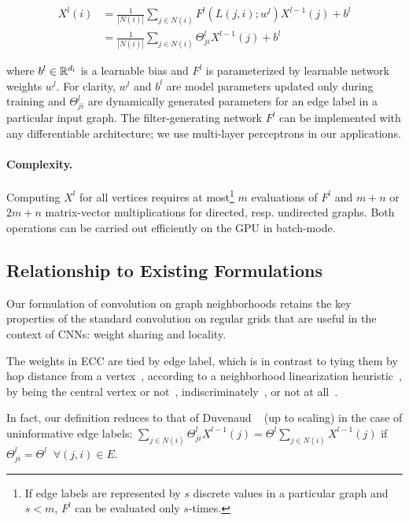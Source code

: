 \documentclass[10pt,twocolumn,letterpaper]{article}
\begin{document}
\begin{equation}
\begin{split}
X^l(i) &= \frac{1}{|N(i)|} \sum_{j\in N(i)} F^l(L(j,i);w^l) X^{l-1}(j) + b^l \label{eq:C1} \\
&= \frac{1}{|N(i)|} \sum_{j\in N(i)} \Theta_{ji}^l X^{l-1}(j) + b^l
\end{split}
\end{equation}

where $b^l\in{\mathbb{R}^{d_l}}$ is a learnable bias and $F^l$ is parameterized by learnable network weights $w^l$. For clarity, $w^l$ and $b^l$ are model parameters updated only during training and $\Theta_{ji}^l$ are dynamically generated parameters for an edge label in a particular input graph. The filter-generating network $F^l$ can be implemented with any differentiable architecture; we use multi-layer perceptrons in our applications.

\paragraph*{Complexity.} Computing $X^l$ for all vertices requires at most\footnote{If edge labels are represented by $s$ discrete values in a particular graph and $s<m$, $F^l$ can be evaluated only $s$-times.} $m$ evaluations of $F^l$ and $m+n$ or $2m+n$ matrix-vector multiplications for directed, resp. undirected graphs. Both operations can be carried out efficiently on the GPU in batch-mode.



\subsection{Relationship to Existing Formulations} \label{subsec:relgridconv}


Our formulation of convolution on graph neighborhoods retains the key properties of the standard convolution on regular grids that are useful in the context of CNNs: weight sharing and locality. 

The weights in ECC are tied by edge label, which is in contrast to tying them by hop distance from a vertex~\cite{dcnn}, according to a neighborhood linearization heuristic~\cite{niepert}, by being the central vertex or not~\cite{kipf}, indiscriminately~\cite{duvenaud}, or not at all~\cite{bruna13}.

In fact, our definition reduces to that of Duvenaud \etal~\cite{duvenaud} (up to scaling) in the case of uninformative edge labels: 
$\sum_{j\in N(i)} \Theta_{ji}^l X^{l-1}(j) = \Theta^l \sum_{j\in N(i)} X^{l-1}(j)$ if $\Theta_{ji}^l = \Theta^l \;\;\forall (j,i)\in E$.
\end{document}
